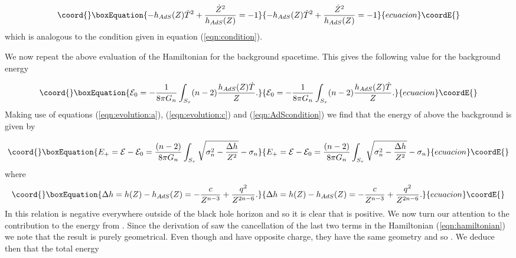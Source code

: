 \documentclass[a4paper,12pt]{article}
\begin{document}
\begin{equation}\coord{}\boxEquation{ \label{eqn:AdScondition}
-h_{AdS}(Z)\dot{T}^2+\frac{\dot{Z}^2}{h_{AdS}(Z)}=-1
}{ -h_{AdS}(Z)\dot{T}^2+\frac{\dot{Z}^2}{h_{AdS}(Z)}=-1
}{ecuacion}\coordE{}\end{equation} 
which is analogous to the condition given in equation
(\ref{eqn:condition}).

We now repeat the above evaluation of the Hamiltonian for the
background spacetime. This gives the following value for the
background energy

\begin{equation}\coord{}\boxEquation{
\mathcal{E}_0= -\frac{1}{8 \pi G_n} \int_{S_{\tau}}
(n-2)\frac{h_{AdS}(Z) \dot{T}}{Z}.
}{
\mathcal{E}_0= -\frac{1}{8 \pi G_n} \int_{S_{\tau}}
(n-2)\frac{h_{AdS}(Z) \dot{T}}{Z}.
}{ecuacion}\coordE{}\end{equation}
Making use of equations (\ref{eqn:evolution:a}),
(\ref{eqn:evolution:c}) and (\ref{eqn:AdScondition}) we find that the
energy of \coordHE{} above the background \coordHE{} is
given by

\begin{equation}\coord{}\boxEquation{
E_+=\mathcal{E}-\mathcal{E}_0=\frac{(n-2)}{8 \pi G_n} \int_{S_{\tau}}
\sqrt{\sigma_n^2-\frac{\Delta h}{Z^2}} -\sigma_n
}{
E_+=\mathcal{E}-\mathcal{E}_0=\frac{(n-2)}{8 \pi G_n} \int_{S_{\tau}}
\sqrt{\sigma_n^2-\frac{\Delta h}{Z^2}} -\sigma_n
}{ecuacion}\coordE{}\end{equation}
where
\begin{equation}\coord{}\boxEquation{
\Delta h=h(Z)-h_{AdS}(Z)=-\frac{c}{Z^{n-3}}+\frac{q^2}{Z^{2n-6}}.
}{
\Delta h=h(Z)-h_{AdS}(Z)=-\frac{c}{Z^{n-3}}+\frac{q^2}{Z^{2n-6}}.
}{ecuacion}\coordE{}\end{equation}
In this relation \coordHE{} is negative everywhere outside of the
black hole horizon and so it is clear that \coordHE{} is positive.  We now
turn our attention to the contribution to the energy from
\coordHE{}. Since the derivation of \coordHE{} saw the cancellation of
the last two terms in the Hamiltonian (\ref{eqn:hamiltonian}) we note
that the result is purely geometrical. Even though \coordHE{} and
\coordHE{} have opposite charge, they have the same geometry and
so \coordHE{}. We deduce then that the total energy
\end{document}
